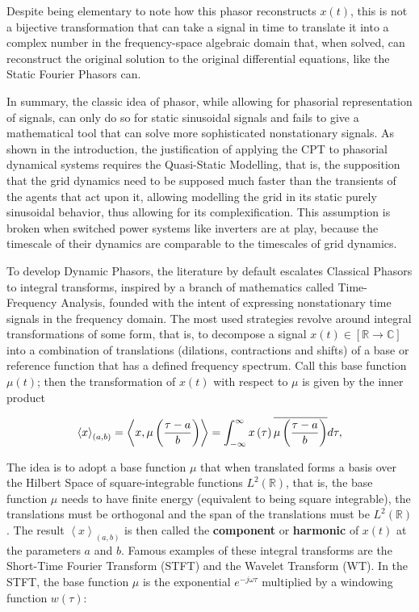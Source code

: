 	Despite being elementary to note how this phasor reconstructs $x(t)$, this is not a bijective transformation that can take a signal in time to translate it into a complex number in the frequency-space algebraic domain that, when solved, can reconstruct the original solution to the original differential equations, like the Static Fourier Phasors can.

	In summary, the classic idea of phasor, while allowing for phasorial representation of signals, can only do so for static sinusoidal signals and fails to give a mathematical tool that can solve more sophisticated nonstationary signals. As shown in the introduction, the justification of applying the CPT to phasorial dynamical systems requires the Quasi-Static Modelling, that is, the supposition that the grid dynamics need to be supposed much faster than the transients of the agents that act upon it, allowing modelling the grid in its static purely sinusoidal behavior, thus allowing for its complexification. This assumption is broken when switched power systems like inverters are at play, because the timescale of their dynamics are comparable to the timescales of grid dynamics.

	To develop Dynamic Phasors, the literature by default escalates Classical Phasors to integral transforms, inspired by a branch of mathematics called Time-Frequency Analysis, founded with the intent of expressing nonstationary time signals in the frequency domain. The most used strategies revolve around integral transformations of some form, that is, to decompose a signal $x(t)\in\left[\mathbb{R}\to\mathbb{C}\right]$ into a combination of translations (dilations, contractions and shifts) of a base or reference function that has a defined frequency spectrum. Call this base function $\mu\left(t\right)$; then the transformation of $x(t)$ with respect to $\mu$ is given by the inner product

\begin{equation} \left< x \right>_{\left(a,b\right)} = \left<x,\mu \left(\dfrac{\tau-a}{b}\right)\right> = \int_{-\infty}^{\infty} x\left(\tau\right)\overline{\raisebox{5mm}{} \mu \left(\dfrac{\tau-a}{b}\right)} d\tau, \end{equation}

	The idea is to adopt a base function $\mu$ that when translated forms a basis over the Hilbert Space of square-integrable functions $L^2\left(\mathbb{R}\right)$, that is, the base function $\mu$ needs to have finite energy (equivalent to being square integrable), the translations must be orthogonal and the span of the translations must be $L^2\left(\mathbb{R}\right)$. The result $\left< x \right>_{\left(a,b\right)}$ is then called the \textbf{component} or \textbf{harmonic} of $x(t)$ at the parameters $a$ and $b$. Famous examples of these integral transforms are the Short-Time Fourier Transform (STFT) and the Wavelet Transform (WT). In the STFT, the base function $\mu$ is the exponential $e^{-j\omega \tau}$ multiplied by a windowing function $w\left(\tau\right)$:

